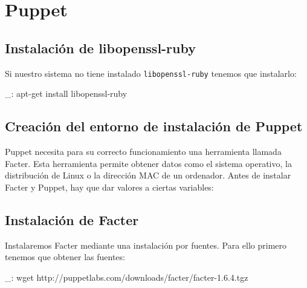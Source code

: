 \chapter{Puppet}
\label{anx:puppet}


\section{Instalación de libopenssl-ruby}

Si nuestro sistema no tiene instalado \texttt{libopenssl-ruby} tenemos que instalarlo:

\begin{bashcode}
_: apt-get install libopenssl-ruby
\end{bashcode}


\section{Creación del entorno de instalación de Puppet}

Puppet necesita para su correcto funcionamiento una herramienta llamada Facter. Esta herramienta permite obtener datos como el sistema operativo, la distribución de Linux o la dirección MAC de un ordenador. Antes de instalar Facter y Puppet, hay que dar valores a ciertas variables:



\section{Instalación de Facter}

Instalaremos Facter mediante una instalación por fuentes. Para ello primero tenemos que obtener las fuentes:

\begin{bashcode}
_: wget http://puppetlabs.com/downloads/facter/facter-1.6.4.tgz
\end{bashcode}

